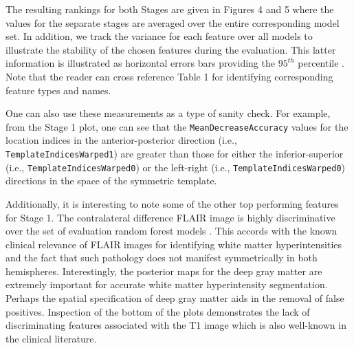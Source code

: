 \documentclass[11pt,]{article}
\begin{document}
The resulting rankings for both Stages are given in Figures 4 and 5
where the values for the separate stages are averaged over the entire
corresponding model set. In addition, we track the variance for each
feature over all models to illustrate the stability of the chosen
features during the evaluation. This latter information is illustrated
as horizontal errors bars providing the \(95^{th}\) percentile
. Note that the reader can
cross reference Table 1 for identifying corresponding feature types and
names.

One can also use these measurements as a type of sanity check. For
example, from the Stage 1 plot, one can see that the
\texttt{MeanDecreaseAccuracy} values for the location indices in the
anterior-posterior direction (i.e., \texttt{TemplateIndicesWarped1}) are
greater than those for either the inferior-superior (i.e.,
\texttt{TemplateIndicesWarped0}) or the left-right (i.e.,
\texttt{TemplateIndicesWarped0}) directions in the space of the
symmetric template.

Additionally, it is interesting to note some of the other top performing
features for Stage 1. The contralateral difference FLAIR image is highly
discriminative over the set of evaluation random forest models
. This accords with the known clinical
relevance of FLAIR images for identifying white matter hyperintensities
and the fact that such pathology does not 
manifest symmetrically in both hemispheres. Interestingly, the posterior
maps for the deep gray matter are extremely important for accurate white
matter hyperintensity segmentation. Perhaps the spatial specification of
deep gray matter aids in the removal of false positives. Inspection of
the bottom of the plots demonstrates the lack of discriminating features
associated with the T1 image which is also well-known in the clinical
literature.
\end{document}
